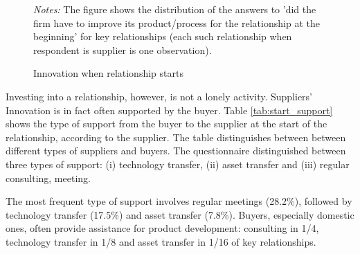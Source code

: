 \documentclass[final, dvipsnames, authoryear,12pt]{elsarticle}
\begin{document}
    
 \begin{figure}[h]    
    \begin{center}
    \caption{Innovation when relationship starts}  
     \label{fig:innov}
    \end{center}
    {\footnotesize \textit{Notes:} The figure shows the distribution of the answers to ’did the firm have to improve its product/process for the relationship at the beginning’ for key relationships (each such relationship when respondent is supplier is one observation).}     
\end{figure}   
    
Investing into a relationship, however, is not a lonely activity. Suppliers' Innovation is in fact often supported by the buyer. Table \ref{tab:start_support} shows the type of support from the buyer to the supplier at the start of the relationship, according to the supplier. The table distinguishes between between different types of suppliers and buyers. The questionnaire distinguished between three types of support: (i) technology transfer, (ii) asset transfer and (iii) regular consulting, meeting.

The most frequent type of support involves regular meetings (28.2\%), followed by technology transfer (17.5\%) and asset transfer (7.8\%). Buyers, especially domestic ones, often provide assistance for product development: consulting in 1/4, technology transfer in 1/8 and asset transfer in 1/16 of key relationships.
\end{document}
